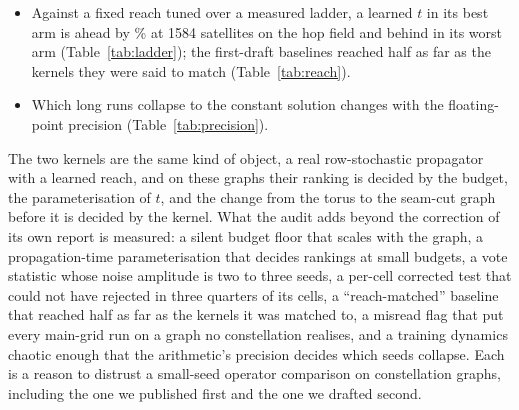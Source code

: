 \documentclass[preprint,11pt,3p]{elsarticle}
\begin{document}
\begin{itemize}
  kernel takes the 1584-satellite hop cell on MAE at the corrected level
  (Table~\ref{tab:seampooled}), on nine seeds, surviving three of four ways of restoring the
  tenth; on the far-node metric nothing is certified on that graph
  (Table~\ref{tab:seampooledaurc}). The other five (task, shell) pairs read as on the
  torus.
\item Against a fixed reach tuned over a measured ladder, a learned $t$ in its best arm is ahead
  by \numLadderGapBestPctHopsShellOne\% at 1584 satellites on the hop field and behind in its
  worst arm (Table~\ref{tab:ladder}); the first-draft baselines reached half as far as the
  kernels they were said to match (Table~\ref{tab:reach}).
\item Which long runs collapse to the constant solution changes with the floating-point
  precision (Table~\ref{tab:precision}).
\end{itemize}
The two kernels are the same kind of object, a real row-stochastic propagator with a learned
reach, and on these graphs their ranking is decided by the budget, the parameterisation of $t$,
and the change from the torus to the seam-cut graph before it is decided by the kernel. What the audit adds beyond the
correction of its own report is measured: a silent budget floor that scales with the graph, a
propagation-time parameterisation that decides rankings at small budgets, a vote statistic whose
noise amplitude is two to three seeds, a per-cell corrected test that could not have rejected in
three quarters of its cells, a ``reach-matched'' baseline that reached half as far as the
kernels it was matched to, a misread flag that put every main-grid run on a graph no
constellation realises, and a training dynamics chaotic enough that the arithmetic's precision
decides which seeds collapse. Each is a reason to distrust a small-seed operator comparison on
constellation graphs, including the one we published first and the one we drafted second.
\end{document}
